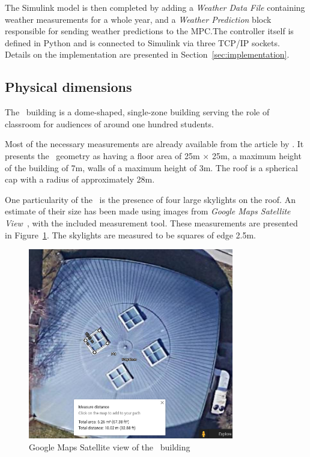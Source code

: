\clearpage

The Simulink model is then completed by adding a \textit{Weather Data File}
containing weather measurements for a whole year, and a \textit{Weather
Prediction} block responsible for sending weather predictions to the MPC.\@ The
controller itself is defined in Python and is connected to Simulink via three
TCP/IP sockets. Details on the implementation are presented in
Section~\ref{sec:implementation}.

\subsection{Physical dimensions}\label{sec:Physical_dimensions}

The \pdome\ building is a dome-shaped, single-zone building serving the role
of classroom for audiences of around one hundred students.

Most of the necessary measurements are already available from the
 article by
\textcite{nattererPolydomeTimberShell1993}. It presents the \pdome\ geometry as
having a floor area of 25m $\times$ 25m, a maximum height of the building of 7m,
walls of a maximum height of 3m. The roof is a spherical cap with a radius of
approximately 28m.

One particularity of the \pdome\  is the presence of four large skylights on the
roof. An estimate of their size has been made using images from \textit{Google
Maps Satellite View}~\cite{GoogleMaps}, with the included measurement tool. These
measurements are presented in Figure~\ref{fig:Google_Maps_Skylights}. The
skylights are measured to be squares of edge 2.5m.

\begin{figure}[ht]
    \centering
    \includegraphics[width = 0.8\textwidth]{Images/google_maps_polydome_skylights}
    \caption{Google Maps Satellite view of the \pdome\ building}
    \label{fig:Google_Maps_Skylights}
\end{figure}

